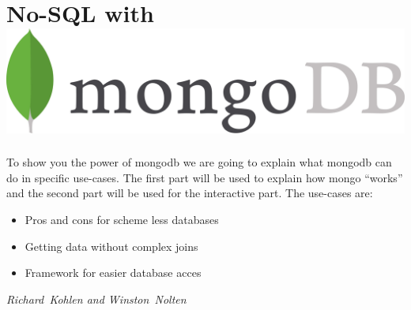 


\section*{No-SQL with \includegraphics[width=.5\linewidth]{images/mongodb.jpg}}
To show you the power of mongodb we are going to explain what mongodb can do in specific use-cases. The first part will be used to explain how mongo “works” and the second part will be used for the interactive part. The use-cases are:
\begin{itemize}
        \item Pros and cons for scheme less databases 
        \item Getting data without complex joins
        \item Framework for easier database acces
\end{itemize}

\hfill\textit{Richard~Kohlen and Winston~Nolten}